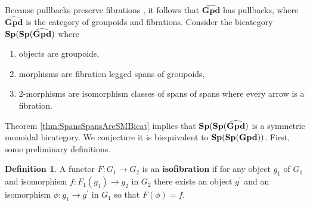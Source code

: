 \documentclass[11pt]{amsart}
\newcommand{\cat}[1]{\mathbf{#1}}
\theoremstyle{remark}
\theoremstyle{definition}
\newtheorem{defn}[thm]{Definition}
\begin{document}
Because pullbacks preserve fibrations 
	\cite{Brown,Heath}, 
it follows that $\widehat{\cat{Gpd}}$ has pullbacks, 
where $\widehat{\cat{Gpd}}$ is the 
category of groupoids and fibrations. 
Consider the bicategory 
	$\bold{Sp(Sp(\widehat{Gpd})}$ 
where
\begin{enumerate}
\item objects are groupoids,
\item morphisms are fibration legged spans of groupoids,
\item 2-morphisms are isomorphism classes of spans of spans where every arrow is a fibration.
\end{enumerate}
Theorem 
	\ref{thm:SpansSpansAreSMBicat} 
implies that $\bold{Sp(Sp(\widehat{Gpd})}$ 
is a symmetric monoidal bicategory. 
We conjecture it is biequivalent to $\bold{Sp(Sp(Gpd))}$.
First, some preliminary definitions.
\begin{defn}
A functor $F \colon G_{1} \to G_{2}$ 
is an \textbf{isofibration} 
if for any object $g_{1}$ of $G_{1}$ 
and isomorphism 
	$f \colon F_{1}(g_{1}) \to g_{2}$ in $G_{2}$ 
there exists an object $g^\prime$ and 
an isomorphism 
	$\phi \colon g_{1} \to g^\prime$ 
in $G_{1}$ so that $F(\phi)=f$.
\end{defn}
\end{document}
